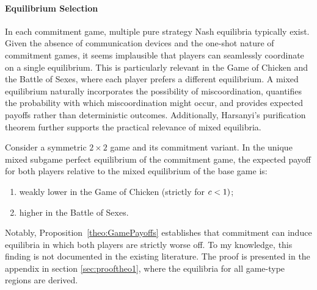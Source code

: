 \documentclass[main.tex]{subfiles}
\begin{document}
\paragraph{Equilibrium Selection} In each commitment game, multiple pure strategy Nash equilibria typically exist. Given the absence of communication devices and the one-shot nature of commitment games, it seems implausible that players can seamlessly coordinate on a single equilibrium. This is particularly relevant in the Game of Chicken and the Battle of Sexes, where each player prefers a different equilibrium. A mixed equilibrium naturally incorporates the possibility of miscoordination, quantifies the probability with which miscoordination might occur, and provides expected payoffs rather than deterministic outcomes. Additionally, Harsanyi’s purification theorem \parencite[]{harsanyi_games_1973} further supports the practical relevance of mixed equilibria. 
\begin{proposition}\label{theo:GamePayoffs}
Consider a symmetric $2\times2$ game and its commitment variant. In the unique mixed subgame perfect equilibrium of the commitment game, the expected payoff for both players relative to the mixed equilibrium of the base game is:
\begin{enumerate}
    \item weakly lower in the Game of Chicken (strictly for $c<1)$;
    \item higher in the Battle of Sexes.
\end{enumerate}
\end{proposition}
\noindent Notably, Proposition~\ref{theo:GamePayoffs} establishes that commitment can induce equilibria in which both players are strictly worse off. To my knowledge, this finding is not documented in the existing literature. The proof is presented in the appendix in section \ref{sec:prooftheo1}, where the equilibria for all game-type regions are derived. 
 
\end{document}
